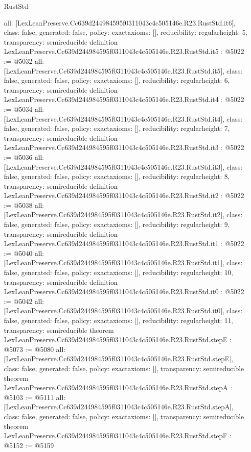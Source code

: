 \begin{lexlean}{RustStd}
\begin{coremodule}
{  all: [LexLeanPreserve.Cc639d244984595f0311043c4c505146e.R23.RustStd.it6],
  class: false,
  generated: false,
  policy: exact{axioms: []},
  reducibility: regular{height: 5},
  transparency: semireducible
}
definition LexLeanPreserve.Cc639d244984595f0311043c4c505146e.R23.RustStd.it5 : @5022 := @5032 {
  all: [LexLeanPreserve.Cc639d244984595f0311043c4c505146e.R23.RustStd.it5],
  class: false,
  generated: false,
  policy: exact{axioms: []},
  reducibility: regular{height: 6},
  transparency: semireducible
}
definition LexLeanPreserve.Cc639d244984595f0311043c4c505146e.R23.RustStd.it4 : @5022 := @5034 {
  all: [LexLeanPreserve.Cc639d244984595f0311043c4c505146e.R23.RustStd.it4],
  class: false,
  generated: false,
  policy: exact{axioms: []},
  reducibility: regular{height: 7},
  transparency: semireducible
}
definition LexLeanPreserve.Cc639d244984595f0311043c4c505146e.R23.RustStd.it3 : @5022 := @5036 {
  all: [LexLeanPreserve.Cc639d244984595f0311043c4c505146e.R23.RustStd.it3],
  class: false,
  generated: false,
  policy: exact{axioms: []},
  reducibility: regular{height: 8},
  transparency: semireducible
}
definition LexLeanPreserve.Cc639d244984595f0311043c4c505146e.R23.RustStd.it2 : @5022 := @5038 {
  all: [LexLeanPreserve.Cc639d244984595f0311043c4c505146e.R23.RustStd.it2],
  class: false,
  generated: false,
  policy: exact{axioms: []},
  reducibility: regular{height: 9},
  transparency: semireducible
}
definition LexLeanPreserve.Cc639d244984595f0311043c4c505146e.R23.RustStd.it1 : @5022 := @5040 {
  all: [LexLeanPreserve.Cc639d244984595f0311043c4c505146e.R23.RustStd.it1],
  class: false,
  generated: false,
  policy: exact{axioms: []},
  reducibility: regular{height: 10},
  transparency: semireducible
}
definition LexLeanPreserve.Cc639d244984595f0311043c4c505146e.R23.RustStd.it0 : @5022 := @5042 {
  all: [LexLeanPreserve.Cc639d244984595f0311043c4c505146e.R23.RustStd.it0],
  class: false,
  generated: false,
  policy: exact{axioms: []},
  reducibility: regular{height: 11},
  transparency: semireducible
}
theorem LexLeanPreserve.Cc639d244984595f0311043c4c505146e.R23.RustStd.stepE : @5073 := @5080 {
  all: [LexLeanPreserve.Cc639d244984595f0311043c4c505146e.R23.RustStd.stepE],
  class: false,
  generated: false,
  policy: exact{axioms: []},
  transparency: semireducible
}
theorem LexLeanPreserve.Cc639d244984595f0311043c4c505146e.R23.RustStd.stepA : @5103 := @5111 {
  all: [LexLeanPreserve.Cc639d244984595f0311043c4c505146e.R23.RustStd.stepA],
  class: false,
  generated: false,
  policy: exact{axioms: []},
  transparency: semireducible
}
theorem LexLeanPreserve.Cc639d244984595f0311043c4c505146e.R23.RustStd.stepF : @5152 := @5159 {
}
\end{coremodule}
\end{lexlean}
